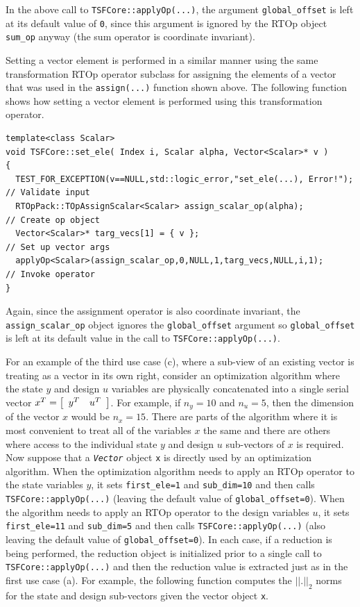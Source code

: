 {}\noindent{}In the above call to \texttt{TSFCore::applyOp(\-...)},
the argument {}\texttt{global\_offset} is left at its default value of
\texttt{0}, since this argument is ignored by the RTOp object
\texttt{sum\_op} anyway (the sum operator is coordinate invariant).

Setting a vector element is performed in a similar manner using the
same transformation RTOp operator subclass for assigning the elements
of a vector that was used in the \texttt{assign(...)} function shown
above.  The following function shows how setting a vector element is
performed using this transformation operator.

{\scriptsize\begin{verbatim}
template<class Scalar>
void TSFCore::set_ele( Index i, Scalar alpha, Vector<Scalar>* v )
{
  TEST_FOR_EXCEPTION(v==NULL,std::logic_error,"set_ele(...), Error!"); // Validate input
  RTOpPack::TOpAssignScalar<Scalar> assign_scalar_op(alpha);           // Create op object
  Vector<Scalar>* targ_vecs[1] = { v };                                // Set up vector args
  applyOp<Scalar>(assign_scalar_op,0,NULL,1,targ_vecs,NULL,i,1);       // Invoke operator
}
\end{verbatim}}

{}\noindent{}Again, since the assignment operator is also coordinate
invariant, the {}\texttt{assign\_scalar\_op} object ignores the
\texttt{global\_offset} argument so \texttt{global\_offset} is left at
its default value in the call to \texttt{TSFCore::applyOp(\-...)}.

For an example of the third use case (c), where a sub-view of an
existing vector is treating as a vector in its own right, consider an
optimization algorithm where the state $y$ and design $u$ variables
are physically concatenated into a single serial vector $x^T =
{\bmat{cc} y^T & u^T \emat}$.  For example, if $n_y = 10$ and $n_u =
5$, then the dimension of the vector $x$ would be $n_x = 15$.  There
are parts of the algorithm where it is most convenient to treat all of
the variables $x$ the same and there are others where access to the
individual state $y$ and design $u$ sub-vectors of $x$ is required.
Now suppose that a \texttt{\textit{Vector}} object \texttt{x} is
directly used by an optimization algorithm.  When the optimization
algorithm needs to apply an RTOp operator to the state variables $y$, it
sets \texttt{first\_ele=1} and \texttt{sub\_dim=10} and then calls
\texttt{TSFCore::applyOp(\-...)} (leaving the default value of
\texttt{global\_offset=0}).  When the algorithm needs to apply an
RTOp operator to the design variables $u$, it sets
\texttt{first\_ele=11} and \texttt{sub\_dim=5} and then calls
\texttt{TSFCore::applyOp(\-...)} (also leaving the default value of
\texttt{global\_offset=0}).  In each case, if a reduction is being performed,
the reduction object is initialized prior to a single call to
\texttt{TSFCore::applyOp(\-...)} and then the reduction value is extracted
just as in the first use case (a).  For example, the following
function computes the $||.||_2$ norms for the state and design
sub-vectors given the vector object \texttt{x}.

